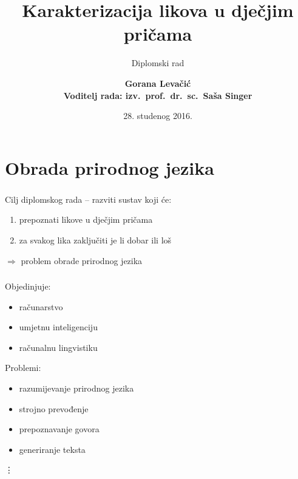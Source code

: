 \documentclass[t, xcolor={usenames,dvipsnames,svgnames,table}]{beamer}
\title[Karakterizacija likova]{Karakterizacija likova u dječjim pričama}
\subtitle{Diplomski rad}
\institute{Prirodoslovno matematički fakultet - Matematički odsjek}
\author[Gorana Levačić]{\textbf {Gorana Levačić \\ \footnotesize Voditelj rada: izv.~prof.~dr.~sc.~Saša Singer}}
\date{28. studenog 2016.}
\begin{document}
	

\begin{frame}
	\titlepage
\end{frame}

\begin{frame}
	\tableofcontents
\end{frame}

\section{Obrada prirodnog jezika}

	\begin{frame}
		\sectionpage
	\end{frame}

	\begin{frame}
		\frametitle{\secname}
		
		Cilj diplomskog rada -- razviti sustav koji će:
		\begin{enumerate}
			\item 	prepoznati likove u dječjim pričama
			\item 	za svakog lika zaključiti je li dobar ili loš
		\end{enumerate}
		
		\medskip
		
		$\Rightarrow$ problem obrade prirodnog jezika
	
	\end{frame}
		
	\begin{frame}
		\frametitle{\secname}
		
		Objedinjuje:	
		\begin{itemize}
			\item	računarstvo
			\item 	umjetnu inteligenciju 
			\item 	računalnu lingvistiku
		\end{itemize}
		
		\medskip
		
		Problemi:
		\begin{itemize}
			\item	razumijevanje prirodnog jezika
			\item 	strojno prevođenje
			\item 	prepoznavanje govora
			\item 	generiranje teksta
		\end{itemize}
		
		\hspace{0.8em} \vdots
	
	\end{frame}
	
\end{document}
